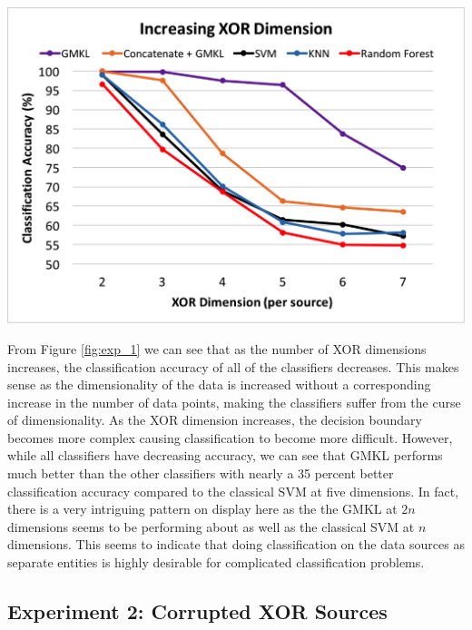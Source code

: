 \documentclass{article}
\begin{document}
\begin{minipage}{\textwidth}
\centering
\includegraphics[scale=0.4]{experimentpic1.png}
\label{fig:exp_1}
\end{minipage}


From Figure \ref{fig:exp_1} we can see that as the number of XOR dimensions
increases, the classification accuracy of all of the classifiers decreases.
This makes sense as the dimensionality of the data is increased without a
corresponding increase in the number of data points, making the classifiers
suffer from the curse of dimensionality. As the XOR dimension increases, the
decision boundary becomes more complex causing classification to become more
difficult. However, while all classifiers have decreasing accuracy, we can see
that GMKL performs much better than the other classifiers with nearly a 35
percent better classification accuracy compared to the classical SVM at five
dimensions. In fact, there is a very intriguing pattern on display here as the
the GMKL at $2n$ dimensions seems to be performing about as well as the
classical SVM at $n$ dimensions. This seems to indicate that doing
classification on the data sources as separate entities is highly desirable for
complicated classification problems.











\subsection*{Experiment 2: Corrupted XOR Sources}
\end{document}
